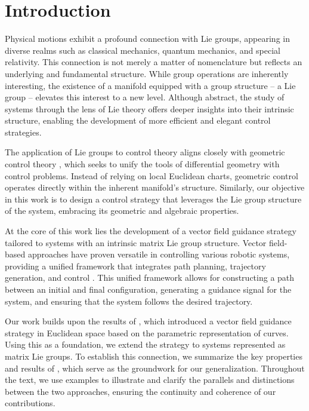\chapter{Introduction}\label{chap:Intro}
Physical motions exhibit a profound connection with Lie groups, appearing in diverse realms such as classical mechanics, quantum mechanics, and special relativity. This connection is not merely a matter of nomenclature but reflects an underlying and fundamental structure. While group operations are inherently interesting, the existence of a manifold equipped with a group structure -- a Lie group -- elevates this interest to a new level. Although abstract, the study of systems through the lens of Lie theory offers deeper insights into their intrinsic structure, enabling the development of more efficient and elegant control strategies.

The application of Lie groups to control theory aligns closely with geometric control theory \citep{Bullo2004}, which seeks to unify the tools of differential geometry with control problems. Instead of relying on local Euclidean charts, geometric control operates directly within the inherent manifold's structure. Similarly, our objective in this work is to design a control strategy that leverages the Lie group structure of the system, embracing its geometric and algebraic properties.

At the core of this work lies the development of a vector field guidance strategy tailored to systems with an intrinsic matrix Lie group structure. Vector field-based approaches have proven versatile in controlling various robotic systems, providing a unified framework that integrates path planning, trajectory generation, and control \citep{goncalves2010vectorfield,yao2021singularity,Rezende2022,Gao2022,nunes2023quadcopter,yao2022topological,Chen2025}. This unified framework allows for constructing a path between an initial and final configuration, generating a guidance signal for the system, and ensuring that the system follows the desired trajectory.

Our work builds upon the results of \citet{Rezende2022}, which introduced a vector field guidance strategy in Euclidean space based on the parametric representation of curves. Using this as a foundation, we extend the strategy to systems represented as matrix Lie groups. To establish this connection, we summarize the key properties and results of \citet{Rezende2022}, which serve as the groundwork for our generalization. Throughout the text, we use examples to illustrate and clarify the parallels and distinctions between the two approaches, ensuring the continuity and coherence of our contributions.

